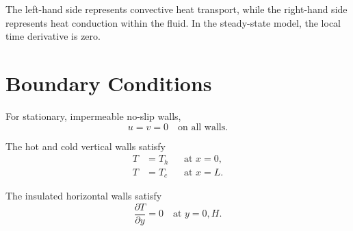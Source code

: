 \documentclass[preprint,3p,number]{elsarticle}
\begin{document}
The left-hand side represents convective heat transport,
while the right-hand side represents heat conduction within
the fluid. In the steady-state model, the local time
derivative is zero.

\section{Boundary Conditions}

For stationary, impermeable no-slip walls,
\begin{equation}
u=v=0
\quad \text{on all walls}.
\end{equation}

The hot and cold vertical walls satisfy
\begin{align}
T&=T_h &&\text{at }x=0,\\
T&=T_c &&\text{at }x=L.
\end{align}

The insulated horizontal walls satisfy
\begin{equation}
\frac{\partial T}{\partial y}=0
\quad\text{at }y=0,H.
\end{equation}
\end{document}
